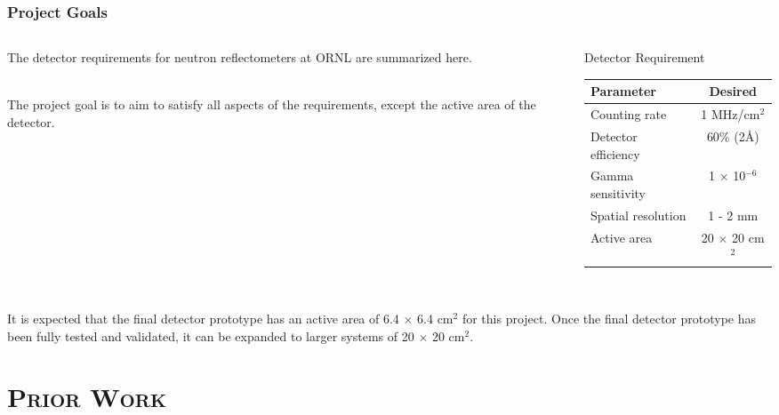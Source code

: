 \documentclass[xcolor=x11names, compress, handout]{beamer}
\renewcommand{\(}{\begin{columns}}
\renewcommand{\)}{\end{columns}}
\newcommand{\<}[1]{\begin{column}{#1}}
\renewcommand{\>}{\end{column}}
\begin{document}
\begin{frame}
  \frametitle{Project Goals}
  \begin{columns}
  \begin{column}{0.45\textwidth}
  The detector requirements for neutron reflectometers at ORNL are summarized here. \\
  \

  The project goal is to aim to satisfy all aspects of the requirements, except the active area of the detector.\\ 
  \

  \end{column}

  \begin{column}{0.5\textwidth}  %
  \begin{block}{Detector Requirement}
  \begin{center}
  \begin{tabular}{l c}
  \hline
  Parameter & Desired \\
  \hline
  Counting rate & 1 MHz/cm$^2$\\
  Detector efficiency & 60\% (2\AA) \\
  Gamma sensitivity & 1 $\times$ 10$^{-6}$\\
  Spatial resolution & 1 - 2 mm \\
  Active area & 20 $\times$ 20 cm$^2$\\
  \hline
  \end{tabular}
  \end{center}
  \end{block}

  \end{column}
  \end{columns}

  \
  \
  \\

  It is expected that the final detector prototype has an active area of 6.4 $\times$ 6.4 cm$^2$ for this project. Once the final detector prototype has been fully tested and validated, it can be expanded to larger systems of 20 $\times$ 20 cm$^2$.

\end{frame}

\section{\scshape Prior Work}
\end{document}
